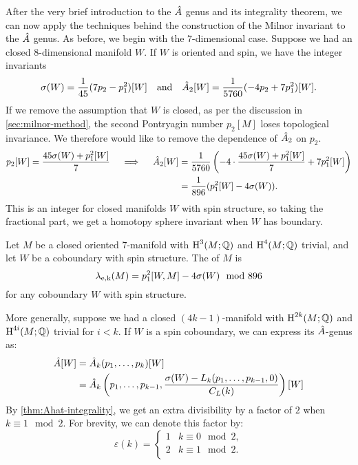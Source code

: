 After the very brief introduction to the ${\hat{A}}$ genus and its integrality theorem, we can now apply the techniques behind the construction of the Milnor invariant to the ${\hat{A}}$ genus. As before, we begin with the $7$-dimensional case. Suppose we had an closed $8$-dimensional manifold $W$. If $W$ is oriented and spin, we have the integer invariants
\[
	\sigma(W) = \frac{1}{45}(7p_2- p_1^2)[W]\quad\textrm{and}\quad{\hat{A}}_2[W] = \frac{1}{5760}(-4p_2 + 7p_1^2)[W].
\]
If we remove the assumption that $W$ is closed, as per the discussion in \cref{sec:milnor-method}, the second Pontryagin number $p_2[M]$ loses topological invariance. We therefore would like to remove the dependence of ${\hat{A}}_2$ on $p_2$.
\[
	\begin{aligned}
		p_2[W] = \frac{45\sigma(W) +p_1^2[W]}{7}\quad\implies\quad
		{\hat{A}}_2[W] & = \frac{1}{5760}\left(-4\cdot \frac{45\sigma(W) + p_1^2[W]}{7} + 7p_1^2[W]\right) \\
		           & =\frac{1}{896}(p_1^2[W]-4\sigma(W)).
	\end{aligned}
\]
This is an integer for closed manifolds $W$ with spin structure, so taking the fractional part, we get a homotopy sphere invariant when $W$ has boundary.

\begin{definition}\label{def:eells-kupier-7-dimension}
	Let $M$ be a closed oriented $7$-manifold with $\operatorname{H}^3(M;\mathbb{Q})$ and $\operatorname{H}^4(M;\mathbb{Q})$ trivial, and let $W$ be a coboundary with spin structure. The  of $M$ is
	\[
		\lambda_{\mathrm{e,k}}(M) = p_1^2[W, M]-4\sigma(W)\mod 896
	\]
	for any coboundary $W$ with spin structure.
\end{definition}

More generally, suppose we had a closed $(4k-1)$-manifold with $\operatorname{H}^{2k}(M;\mathbb{Q})$ and $\operatorname{H}^{4i}(M;\mathbb{Q})$ trivial for $i<k$. If $W$ is a spin coboundary, we can express its ${\hat{A}}$-genus as:
\[
	\begin{aligned}
		{\hat{A}}[W] & ={\hat{A}}_k(p_1,\ldots, p_k)[W]                                                                       \\
		         & = {\hat{A}}_k\left(p_1, \ldots, p_{k-1}, \frac{\sigma(W)-L_k(p_1,\ldots, p_{k-1},0)}{C_L(k)}\right)[W]
	\end{aligned}
\]
By \cref{thm:Ahat-integrality}, we get an extra divisibility by a factor of $2$ when $k\equiv 1\mod 2$. For brevity, we can denote this factor by:
\[
	\varepsilon(k) =
	\begin{cases}
		1 & k\equiv 0 \mod 2, \\
		2 & k\equiv 1 \mod 2. \\
	\end{cases}
\]

